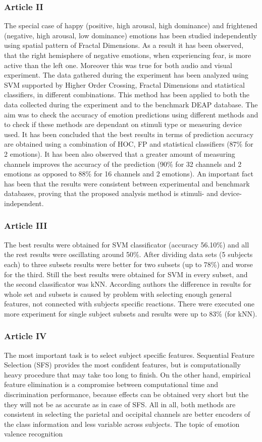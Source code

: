 \documentclass[10pt,journal,compsoc]{IEEEtran}
\begin{document}
\subsubsection*{Article II}
The special case of happy (positive, high arousal, high dominance) and frightened (negative, high arousal, low dominance) emotions has been studied independently using spatial pattern of Fractal Dimensions. As a result it has been observed, that the right hemisphere of negative emotions, when experiencing fear, is more active than the left one. Moreover this was true for both audio and visual experiment. The data gathered during the experiment has been analyzed using SVM supported by Higher Order Crossing, Fractal Dimensions and statistical classifiers, in different combinations. This method has been applied to both the data collected during the experiment and to the benchmark DEAP database. The aim was to check the accuracy of emotion predictions using different methods and to check if these methods are dependant on stimuli type or measuring device used. It has been concluded that the best results in terms of prediction accuracy are obtained using a combination of HOC, FP and statistical classifiers (87\% for 2 emotions). It has been also observed that a greater amount of measuring channels improves the accuracy of the prediction (90\% for 32 channels and 2 emotions as opposed to 88\% for 16 channels and 2 emotions). An important fact has been that the results were consistent between experimental and benchmark databases, proving that the proposed analysis method is stimuli- and device-independent.

\subsubsection*{Article III}
The best results were obtained for SVM classificator (accuracy 56.10\%) and all the rest results were oscillating around 50\%. After dividing data sets (5 subjects each) to three subsets results were better for two subsets (up to 78\%) and worse for the third. Still the best results were obtained for SVM in every subset, and the second classificator was kNN. According authors the difference in results for whole set and subsets is caused by problem with selecting enough general features, not connected with subjects specific reactions. There were executed one more experiment for single subject subsets and results were up to 83\% (for kNN).

\subsubsection*{Article IV}
The most important task is to select subject specific features. Sequential Feature Selection (SFS) provides the most confident features, but is computationally heavy procedure that may take too long to finish. On the other hand, empirical feature elimination is a compromise between computational time and discrimination performance, because effects can be obtained very short but the they will not be as accurate as in case of SFS. All in all, both methods are consistent in selecting the parietal and occipital channels are better encoders of the class information and less variable across subjects. The topic of emotion valence recognition
\end{document}
